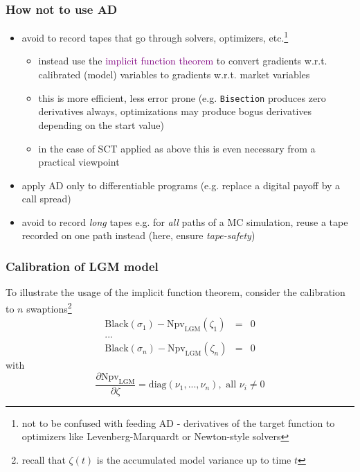 \documentclass[10pt,German]{beamer}
\begin{document}
\begin{frame}[fragile]
\frametitle{How not to use AD}
\begin{itemize}
\item avoid to record tapes that go through solvers, optimizers, etc.\footnote{not to be confused with feeding AD - derivatives of the target function to optimizers like Levenberg-Marquardt or Newton-style solvers}
\begin{itemize}
\item instead use the \textcolor{purple}{implicit function theorem} to convert gradients w.r.t. calibrated (model) variables to gradients w.r.t. market variables
\item this is more efficient, less error prone (e.g. \verb+Bisection+ produces zero derivatives always, optimizations may produce bogus derivatives depending on the start value)
\item in the case of SCT applied as above this is even necessary from a practical viewpoint
\end{itemize}
\item apply AD only to differentiable programs (e.g. replace a digital payoff by a call spread)
\item avoid to record \textit{long} tapes e.g. for \textit{all} paths of a MC simulation, reuse a tape recorded on one path instead (here, ensure \textit{tape-safety})
\end{itemize}
\end{frame}

\begin{frame}[fragile]
\frametitle{Calibration of LGM model}
To illustrate the usage of the implicit function theorem, consider the calibration to $n$ swaptions\footnote{recall that $\zeta(t)$ is the accumulated model variance up to time $t$}
\begin{eqnarray*}
\text{Black}(\sigma_1) - \text{Npv}_{\text{LGM}}(\zeta_1) &=& 0 \\
... \\
\text{Black}(\sigma_n) - \text{Npv}_{\text{LGM}}(\zeta_n) &=& 0
\end{eqnarray*}
with
\begin{equation}
\frac{\partial \text{Npv}_{\text{LGM}}}{\partial \zeta} = \text{diag}(\nu_1, ..., \nu_n), \text{ all } \nu_i \neq 0
\end{equation}
\end{frame}
\end{document}
